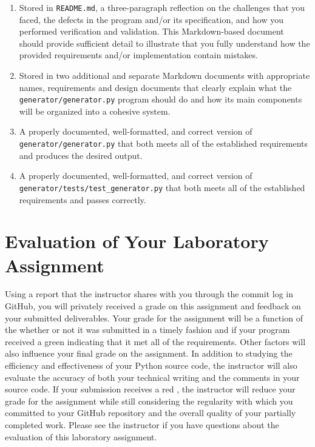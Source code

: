 \documentclass[11pt]{article}
\newcommand{\mainprogramsource}{\lstinline{generator/generator.py}}
\newcommand{\maintestsource}{\lstinline{generator/tests/test_generator.py}}
\newcommand{\reflection}{\lstinline{README.md}}
\newcommand{\checkmark}{\ding{51}}
\newcommand{\naughtmark}{\ding{55}}
\begin{document}
\begin{enumerate}

\setlength{\itemsep}{0in}

\item Stored in \reflection{}, a three-paragraph reflection on the challenges that you faced, the defects in the program
  and/or its specification, and how you performed verification and validation. This Markdown-based document should
  provide sufficient detail to illustrate that you fully understand how the provided requirements and/or implementation
  contain mistakes.

\item Stored in two additional and separate Markdown documents with appropriate names, requirements and design documents
  that clearly explain what the \mainprogramsource{} program should do and how its main components will be organized
  into a cohesive system.

\item A properly documented, well-formatted, and correct version of \mainprogramsource{} that both meets all of the
  established requirements and produces the desired output.

\item A properly documented, well-formatted, and correct version of \maintestsource{} that both meets all of the
  established requirements and passes correctly.

\end{enumerate}

\section*{Evaluation of Your Laboratory Assignment}

Using a report that the instructor shares with you through the commit log in GitHub, you will privately received a grade
on this assignment and feedback on your submitted deliverables. Your grade for the assignment will be a function of the
whether or not it was submitted in a timely fashion and if your program received a green \checkmark{} indicating that it
met all of the requirements. Other factors will also influence your final grade on the assignment. In addition to
studying the efficiency and effectiveness of your Python source code, the instructor will also evaluate the accuracy of
both your technical writing and the comments in your source code. If your submission receives a red \naughtmark{}, the
instructor will reduce your grade for the assignment while still considering the regularity with which you committed to
your GitHub repository and the overall quality of your partially completed work. Please see the instructor if you have
questions about the evaluation of this laboratory assignment.
\end{document}
